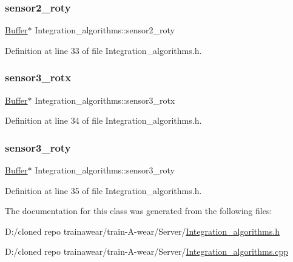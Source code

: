 \subsubsection{\texorpdfstring{sensor2\_roty}{sensor2\_roty}}
{\footnotesize\ttfamily \mbox{\hyperlink{class_buffer}{Buffer}}$\ast$ Integration\+\_\+algorithms\+::sensor2\+\_\+roty\hspace{0.3cm}{\ttfamily [private]}}



Definition at line 33 of file Integration\+\_\+algorithms.\+h.

\mbox{\label{class_integration__algorithms_a6a1bad9a3c085c33d6a4922a007b6a9b}} 
\subsubsection{\texorpdfstring{sensor3\_rotx}{sensor3\_rotx}}
{\footnotesize\ttfamily \mbox{\hyperlink{class_buffer}{Buffer}}$\ast$ Integration\+\_\+algorithms\+::sensor3\+\_\+rotx\hspace{0.3cm}{\ttfamily [private]}}



Definition at line 34 of file Integration\+\_\+algorithms.\+h.

\mbox{\label{class_integration__algorithms_a4170f08224c157734de64da6286bb6ea}} 
\subsubsection{\texorpdfstring{sensor3\_roty}{sensor3\_roty}}
{\footnotesize\ttfamily \mbox{\hyperlink{class_buffer}{Buffer}}$\ast$ Integration\+\_\+algorithms\+::sensor3\+\_\+roty\hspace{0.3cm}{\ttfamily [private]}}



Definition at line 35 of file Integration\+\_\+algorithms.\+h.



The documentation for this class was generated from the following files\+:\begin{DoxyCompactItemize}
\item 
D\+:/cloned repo trainawear/train-\/\+A-\/wear/\+Server/\mbox{\hyperlink{_integration__algorithms_8h}{Integration\+\_\+algorithms.\+h}}\item 
D\+:/cloned repo trainawear/train-\/\+A-\/wear/\+Server/\mbox{\hyperlink{_integration__algorithms_8cpp}{Integration\+\_\+algorithms.\+cpp}}\end{DoxyCompactItemize}
